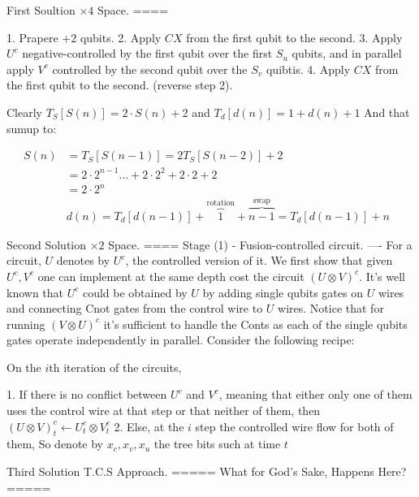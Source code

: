 First Soultion $\times 4$ Space.
==== 

1. Prapere $+2$ qubits.
2. Apply $CX$ from the first qubit to the second.
3. Apply $U^{c}$ negative-controlled by the first qubit over the first $S_{u}$ qubits, and in parallel apply $V^{c}$ controlled by the second qubit over the $S_{v}$ quibtis.   
4. Apply $CX$ from the first qubit to the second. (reverse step 2).

Clearly $T_{S}[S(n)] = 2 \cdot S(n) + 2$ and $T_{d}[d(n)] = 1 + d(n) + 1$ And that sumup to:

 $$ \begin{split} S(n) & = T_{S}[S(n-1)] = 2T_{S}[S(n-2)] + 2  & \\ & = 
2\cdot 2^{n - 1}...+2\cdot 2^{2} +2\cdot 2 + 2 & \\ & = 2\cdot 2^{n} & \\ & d(n) = T_{d}[d(n-1)] + \overbrace{1}^{ \text{rotation} } + \overbrace{n-1}^{\text{swap}} =  T_{d}[d(n-1)] + n   \end{split} $$

Second Solution $\times 2$ Space. 
====
Stage (1) - Fusion-controlled circuit.
----
For a circuit, $U$ denotes by $U^{c}$, the controlled version of it. We first show that given $U^{c},V^{c}$ one can implement at the same depth cost the circuit $(U\otimes V)^{c}$. It's well known that $U^{c}$ could be obtained by $U$ by adding single qubits gates on $U$ wires and connecting Cnot gates from the control wire to $U$ wires. Notice that for running $(V\otimes U)^{c}$ it's sufficient to handle the Conts as each of the single qubits gates operate independently in parallel. Consider the following recipe: 

On the $i$th iteration of the circuits,
  
1. If there is no conflict between $U^{c}$ and $V^{c}$, meaning that either only one of them uses the control wire at that step or that neither of them, then $(U \otimes V)^{c}_{t} \leftarrow U^{c}_{t} \otimes V^{c}_{t}$
2. Else, at the $i$ step the controlled wire flow for both of them, So denote by $ x_{c},x_{v},x_{u}$ the tree bits such at time $t$   


  
 

Third Solution T.C.S Approach.  
=====
What for God's Sake, Happens Here?
=====  

